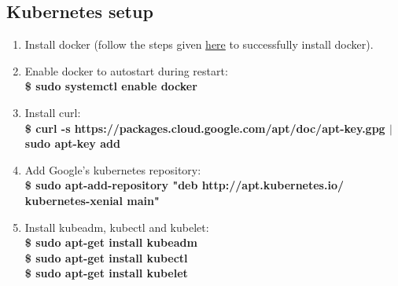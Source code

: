 \documentclass[12pt]{article}
\begin{document}
\subsection{Kubernetes setup}
\begin{enumerate}
	\item Install docker (follow the steps given \hyperref[sec:dockerinstall]{here} to successfully install docker).
	\item Enable docker to autostart during restart:\\
	\textbf{\$ sudo systemctl enable docker}
	\item Install curl:\\
	\textbf{\$ curl -s https://packages.cloud.google.com/apt/doc/apt-key.gpg $\vert$ sudo apt-key add}
	\item Add Google’s kubernetes repository:\\
	\textbf{\$ sudo apt-add-repository "deb http://apt.kubernetes.io/ kubernetes-xenial main"}
	\item Install kubeadm, kubectl and kubelet:\\
	\textbf{\$ sudo apt-get install kubeadm}\\
	\textbf{\$ sudo apt-get install kubectl}\\
	\textbf{\$ sudo apt-get install kubelet}
\end{enumerate}
\end{document}
